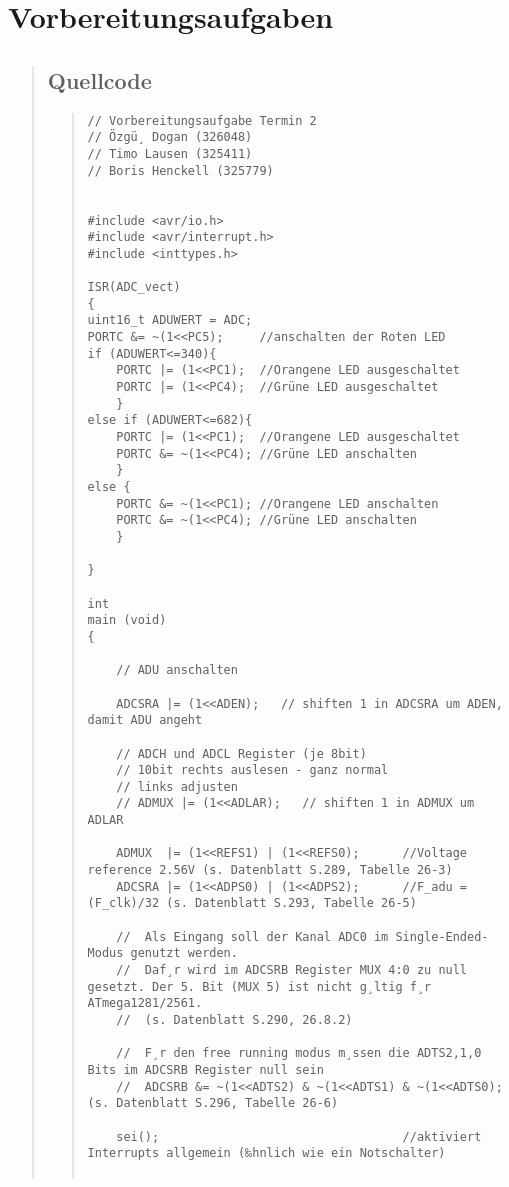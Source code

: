 \section{Vorbereitungsaufgaben}
\begin{quote}
	\subsection{Quellcode}
    \begin{quote}
\begin{lstlisting}
// Vorbereitungsaufgabe Termin 2
// Özgü¸ Dogan (326048)
// Timo Lausen (325411)
// Boris Henckell (325779)


#include <avr/io.h>
#include <avr/interrupt.h>
#include <inttypes.h>

ISR(ADC_vect)
{
uint16_t ADUWERT = ADC;
PORTC &= ~(1<<PC5);     //anschalten der Roten LED
if (ADUWERT<=340){
    PORTC |= (1<<PC1);  //Orangene LED ausgeschaltet
    PORTC |= (1<<PC4);  //Grüne LED ausgeschaltet
    }
else if (ADUWERT<=682){
    PORTC |= (1<<PC1);  //Orangene LED ausgeschaltet
    PORTC &= ~(1<<PC4); //Grüne LED anschalten
    }
else {
    PORTC &= ~(1<<PC1); //Orangene LED anschalten
    PORTC &= ~(1<<PC4); //Grüne LED anschalten
    }

}

int
main (void)
{

    // ADU anschalten

    ADCSRA |= (1<<ADEN);   // shiften 1 in ADCSRA um ADEN, damit ADU angeht

    // ADCH und ADCL Register (je 8bit)
    // 10bit rechts auslesen - ganz normal
    // links adjusten
    // ADMUX |= (1<<ADLAR);   // shiften 1 in ADMUX um ADLAR

    ADMUX  |= (1<<REFS1) | (1<<REFS0);      //Voltage reference 2.56V (s. Datenblatt S.289, Tabelle 26-3)
    ADCSRA |= (1<<ADPS0) | (1<<ADPS2);      //F_adu = (F_clk)/32 (s. Datenblatt S.293, Tabelle 26-5)

    //  Als Eingang soll der Kanal ADC0 im Single-Ended-Modus genutzt werden.
    //  Daf¸r wird im ADCSRB Register MUX 4:0 zu null gesetzt. Der 5. Bit (MUX 5) ist nicht g¸ltig f¸r ATmega1281/2561.
    //  (s. Datenblatt S.290, 26.8.2)

    //  F¸r den free running modus m¸ssen die ADTS2,1,0 Bits im ADCSRB Register null sein
    //  ADCSRB &= ~(1<<ADTS2) & ~(1<<ADTS1) & ~(1<<ADTS0);         (s. Datenblatt S.296, Tabelle 26-6)

    sei();                                  //aktiviert Interrupts allgemein (‰hnlich wie ein Notschalter)
    

\end{lstlisting}
\end{quote}
\end{quote}
